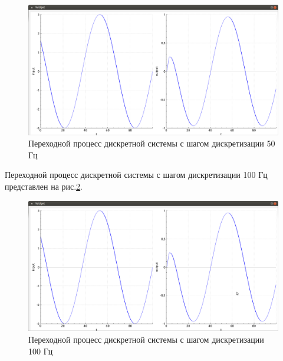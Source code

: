 \documentclass[14pt,a4paper]{extreport}
\begin{document}
\begin{figure}[H]
    \centering
    \includegraphics[width=160mm]{img/50hz.png}
    \caption{Переходной процесс дискретной системы 
    с шагом дискретизации 50 Гц}
    \label{fig:discrete50}
\end{figure}

Переходной процесс дискретной системы с шагом дискретизации 
100 Гц представлен на рис.\ref{fig:discrete100}.

\begin{figure}[H]
    \centering
    \includegraphics[width=160mm]{img/100hz.png}
    \caption{Переходной процесс дискретной системы 
    с шагом дискретизации 100 Гц}
    \label{fig:discrete100}
\end{figure}
\end{document}
